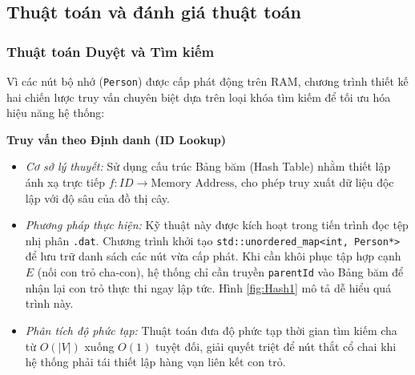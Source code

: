 \subsection{Thuật toán và đánh giá thuật toán}
\subsubsection{Thuật toán Duyệt và Tìm kiếm}

Vì các nút bộ nhớ (\texttt{Person}) được cấp phát động trên RAM, chương trình thiết kế hai chiến lược truy vấn chuyên biệt dựa trên loại khóa tìm kiếm để tối ưu hóa hiệu năng hệ thống:

\textbf{Truy vấn theo Định danh (ID Lookup)}
	\begin{itemize}
		\item \textit{Cơ sở lý thuyết:} Sử dụng cấu trúc Bảng băm (Hash Table) nhằm thiết lập ánh xạ trực tiếp $f: ID \rightarrow \text{Memory Address}$, cho phép truy xuất dữ liệu độc lập với độ sâu của đồ thị cây.
		\item \textit{Phương pháp thực hiện:} Kỹ thuật này được kích hoạt trong tiến trình đọc tệp nhị phân \texttt{.dat}. Chương trình khởi tạo \texttt{std::unordered\_map<int, Person*>} để lưu trữ danh sách các nút vừa cấp phát. Khi cần khôi phục tập hợp cạnh $E$ (nối con trỏ cha-con), hệ thống chỉ cần truyền \texttt{parentId} vào Bảng băm để nhận lại con trỏ thực thi ngay lập tức. Hình \ref{fig:Hash1} mô tả dễ hiểu quá trình này.
		\item \textit{Phân tích độ phức tạp:} Thuật toán đưa độ phức tạp thời gian tìm kiếm cha từ $O(|V|)$ xuống $O(1)$ tuyệt đối, giải quyết triệt để nút thắt cổ chai khi hệ thống phải tái thiết lập hàng vạn liên kết con trỏ.
	\end{itemize}

\vspace{0.5cm}
	


	
